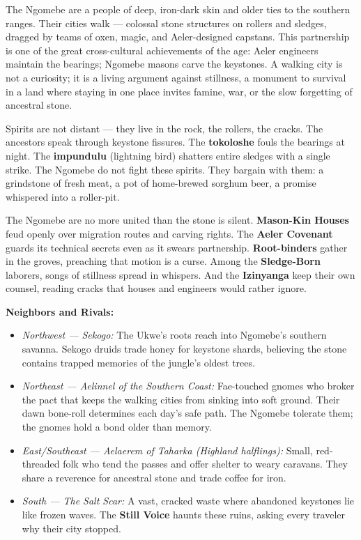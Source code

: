 \vspace{2mm}
\begin{tcolorbox}[colback=black!3,colframe=blue!60!black,title={Theme \& Atmosphere},breakable]
The Ngomebe are a people of deep, iron-dark skin and older ties to the southern ranges. Their cities walk --- colossal stone structures on rollers and sledges, dragged by teams of oxen, magic, and Aeler-designed capstans. This partnership is one of the great cross-cultural achievements of the age: Aeler engineers maintain the bearings; Ngomebe masons carve the keystones. A walking city is not a curiosity; it is a living argument against stillness, a monument to survival in a land where staying in one place invites famine, war, or the slow forgetting of ancestral stone.

Spirits are not distant --- they live in the rock, the rollers, the cracks. The ancestors speak through keystone fissures. The \textbf{tokoloshe} fouls the bearings at night. The \textbf{impundulu} (lightning bird) shatters entire sledges with a single strike. The Ngomebe do not fight these spirits. They bargain with them: a grindstone of fresh meat, a pot of home-brewed sorghum beer, a promise whispered into a roller-pit.

The Ngomebe are no more united than the stone is silent. \textbf{Mason-Kin Houses} feud openly over migration routes and carving rights. The \textbf{Aeler Covenant} guards its technical secrets even as it swears partnership. \textbf{Root-binders} gather in the groves, preaching that motion is a curse. Among the \textbf{Sledge-Born} laborers, songs of stillness spread in whispers. And the \textbf{Izinyanga} keep their own counsel, reading cracks that houses and engineers would rather ignore.

\vspace{2mm}
\textbf{Neighbors and Rivals:}
\begin{itemize}
  \item \textit{Northwest --- Sekogo:} The Ukwe's roots reach into Ngomebe's southern savanna. Sekogo druids trade honey for keystone shards, believing the stone contains trapped memories of the jungle's oldest trees.
  \item \textit{Northeast --- Aelinnel of the Southern Coast:} Fae-touched gnomes who broker the pact that keeps the walking cities from sinking into soft ground. Their dawn bone-roll determines each day's safe path. The Ngomebe tolerate them; the gnomes hold a bond older than memory.
  \item \textit{East/Southeast --- Aelaerem of Taharka (Highland halflings):} Small, red-threaded folk who tend the passes and offer shelter to weary caravans. They share a reverence for ancestral stone and trade coffee for iron.
  \item \textit{South --- The Salt Scar:} A vast, cracked waste where abandoned keystones lie like frozen waves. The \textbf{Still Voice} haunts these ruins, asking every traveler why their city stopped.
\end{itemize}


\end{tcolorbox}
